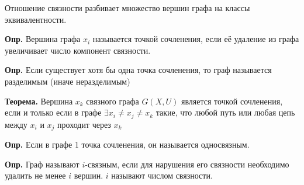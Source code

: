 \documentclass[10pt]{article}
\begin{document}
\par Отношение связности разбивает множество вершин графа на классы эквивалентности.
\par\textbf{Опр.} Вершина графа $x_{i}$ называется точкой сочленения, если её удаление из графа увеличивает число компонент связности.
\par\textbf{Опр.} Если существует хотя бы одна точка сочленения, то граф называется разделимым (иначе неразделимым)
\par\textbf{Теорема.} Вершина $x_{k}$ связного графа $G(X, U)$ является точкой сочленения, если и только если в графе $\exists x_{i} \neq x_{j} \neq x_{k}$ такие, что любой путь или любая цепь между $x_{i}$ и $x_{j}$ проходит через $x_{k}$
\par\textbf{Опр.} Если в графе 1 точка сочленения, он называется односвязным.
\par\textbf{Опр.} Граф называют $i$-связным, если для нарушения его связности необходимо удалить не менее $i$ вершин. $i$ называют числом связности.
\end{document}
